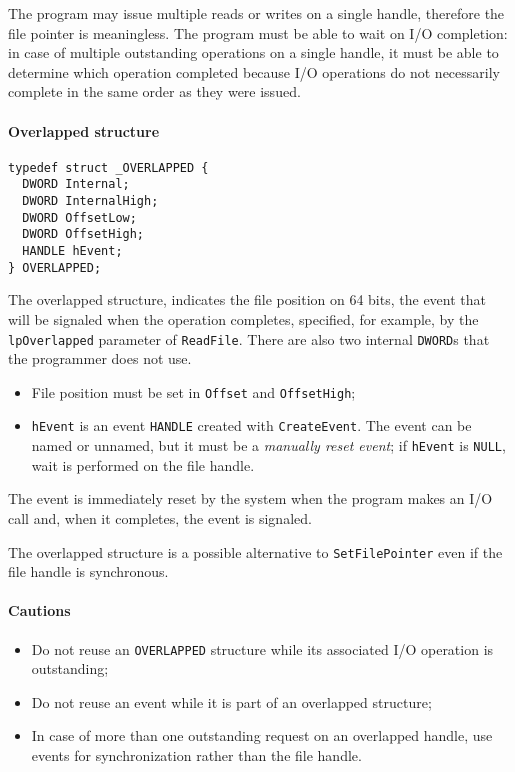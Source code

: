 The program may issue multiple reads or writes on a single handle, therefore the file pointer is meaningless. The program must be able to wait on I/O completion: in case of multiple outstanding operations on a single handle, it must be able to determine which operation completed because I/O operations do not necessarily complete in the same order as they were issued.

\paragraph{Overlapped structure}
\begin{verbatim}
typedef struct _OVERLAPPED {
  DWORD Internal;
  DWORD InternalHigh;
  DWORD OffsetLow;
  DWORD OffsetHigh;
  HANDLE hEvent;
} OVERLAPPED;
\end{verbatim}
The overlapped structure, indicates the file position on 64 bits, the event that will be signaled when the operation completes, specified, for example, by the \texttt{lpOverlapped} parameter of \texttt{ReadFile}. There are also two internal \texttt{DWORD}s that the programmer does not use.

\begin{itemize}
\item File position must be set in \texttt{Offset} and \texttt{OffsetHigh};
\item \texttt{hEvent} is an event \texttt{HANDLE} created with \texttt{CreateEvent}. The event can be named or unnamed, but it must be a \emph{manually reset event}; if \texttt{hEvent} is \texttt{NULL}, wait is performed on the file handle.
\end{itemize}
The event is immediately reset by the system when the program makes an I/O call and, when it completes, the event is signaled.

The overlapped structure is a possible alternative to \texttt{SetFilePointer} even if the file handle is synchronous.

\paragraph{Cautions}
\begin{itemize}
\item Do not reuse an \texttt{OVERLAPPED} structure while its associated I/O operation is outstanding;
\item Do not reuse an event while it is part of an overlapped structure;
\item In case of more than one outstanding request on an overlapped handle, use events for synchronization rather than the file handle.
\end{itemize}


